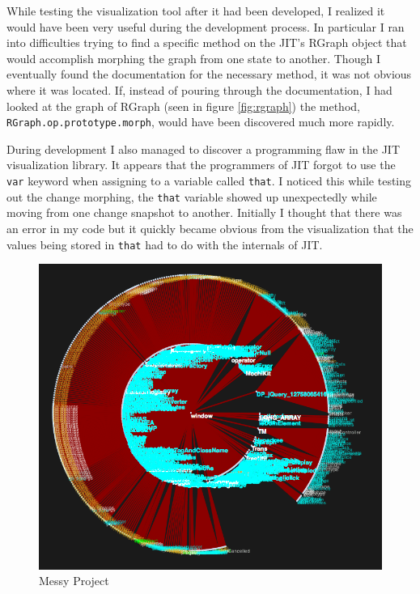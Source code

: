 \documentclass[]{article}
\begin{document}
While testing the visualization tool after it had been developed, I realized it would have been very useful during the development process. In particular I ran into difficulties trying to find a specific method on the JIT's RGraph object that would accomplish morphing the graph from one state to another. Though I eventually found the documentation for the necessary method, it was not obvious where it was located. If, instead of pouring through the documentation, I had looked at the graph of RGraph (seen in figure \ref{fig:rgraph}) the method, {\tt RGraph.op.prototype.morph}, would have been discovered much more rapidly.

During development I also managed to discover a programming flaw in the JIT visualization library. It appears that the programmers of JIT forgot to use the {\tt var} keyword when assigning to a variable called {\tt that}. I noticed this while testing out the change morphing, the {\tt that} variable showed up unexpectedly while moving from one change snapshot to another. Initially I thought that there was an error in my code but it quickly became obvious from the visualization that the values being stored in {\tt that} had to do with the internals of JIT.

\begin{figure}[h]
  \begin{center}
    \includegraphics[scale=.38]{messy.png}
  \end{center}
  \caption{Messy Project}
  \label{fig:messy}
\end{figure}
\end{document}
